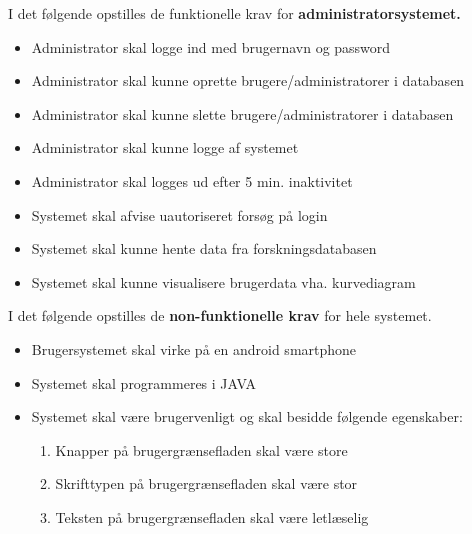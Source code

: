 I det følgende opstilles de funktionelle krav for \textbf{administratorsystemet.}

\begin{itemize}
    \item Administrator skal logge ind med brugernavn og password
    \item Administrator skal kunne oprette brugere/administratorer i databasen
    \item Administrator skal kunne slette brugere/administratorer i databasen
    \item Administrator skal kunne logge af systemet
    \item Administrator skal logges ud efter 5 min. inaktivitet
    \item Systemet skal afvise uautoriseret forsøg på login    
    \item Systemet skal kunne hente data fra forskningsdatabasen
    \item Systemet skal kunne visualisere brugerdata vha. kurvediagram
\end{itemize}

I det følgende opstilles de \textbf{non-funktionelle krav} for hele systemet.

\begin{itemize}
    \item Brugersystemet skal virke på en android smartphone
    \item Systemet skal programmeres i JAVA
    \item Systemet skal være brugervenligt og skal besidde følgende egenskaber:
    \begin{enumerate}
        \item Knapper på brugergrænsefladen skal være store
        \item Skrifttypen på brugergrænsefladen skal være stor 
        \item Teksten på brugergrænsefladen skal være letlæselig
    \end{enumerate}
\end{itemize}